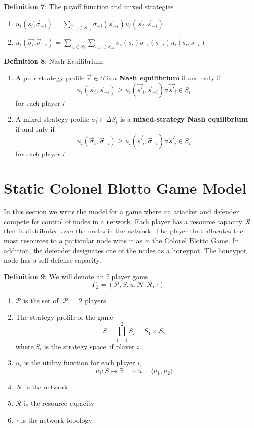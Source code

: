 \documentclass[conference]{IEEEtran}
\begin{document}
\textbf{Definition 7}: The payoff function and mixed strategies
\begin{enumerate}
\item $u_i(\vec{s_i}, \vec{\sigma}_{-i}) = \displaystyle\sum_{\vec{s}_{-i} \in S_{-i}}\sigma_{-i}(\vec{s}_{-i})u_i(\vec{s}_i, \vec{s}_{-i})$
\item $u_i(\vec{\sigma_i}, \vec{\sigma}_{-i}) = \displaystyle\sum_{s_i \in S_i}\sum_{s_{-i} \in S_{-i}}\sigma_i(s_i)\sigma_{-i}(s_{-i})u_i(s_i, s_{-i})$
\end{enumerate}
\textbf{Definition 8}: Nash Equilibrium
\begin{enumerate}

\item A pure strategy profile $\vec{s} \in S$ is a \textbf{Nash equilibrium} if and only if $$u_i(\vec{s}_i, \vec{s}_{-i}) \geq u_i(\vec{s'}_i, \vec{s}_{-i}) \forall{\vec{s'}_i \in S_i}$$ for each player $i$
\item A mixed strategy profile $\vec{\sigma_i} \in \Delta S_i$ is a \textbf{mixed-strategy Nash equilibrium} if and only if $$u_i(\vec{\sigma}_i, \vec{\sigma}_{-i}) \geq u_i(\vec{s'}_i, \vec{\sigma}_{-i}) \forall{\vec{s'}_i \in S_i}$$ for each player $i$.

\end{enumerate}

\section{Static Colonel Blotto Game Model}

In this section we write the model for a game where an attacker and defender compete for control of nodes in a network. Each player has a resource capacity $\mathcal{R}$ that is distributed over the nodes in the network. The player that allocates the most resources to a particular node wins it as in the Colonel Blotto Game. In addition, the defender designates one of the nodes as a honeypot. The honeypot node has a self defense capacity.

\textbf{Definition 9}: We will denote an $2$ player game $$\Gamma_2 = (\mathcal{P}, S, u, \mathcal{N}, \mathcal{R}, \tau)$$
\begin{enumerate}
\item $\mathcal{P}$ is the set of $|\mathcal{P}| = 2$ players
\item The strategy profile of the game $$S = \displaystyle \prod_{i = 1}^2 S_i = S_1 \times S_2$$ where $S_i$ is the strategy space of player $i$.
\item $u_i$ is the utility function for each player $i$, $$u_i \mathpunct{:} S \to \mathbb{R} \implies u = \langle u_1, u_2 \rangle$$
\item $\mathcal{N}$ is the network
\item $\mathcal{R}$ is the resource capacity
\item $\tau$ is the network topology
\end{enumerate}
\end{document}
